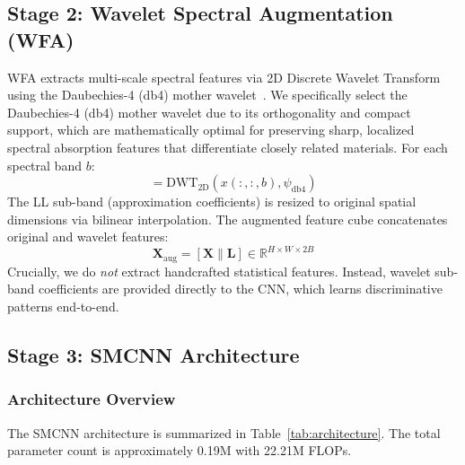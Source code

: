 \documentclass[conference]{IEEEtran}
\begin{document}
{\subsection{Stage 2: Wavelet Spectral Augmentation (WFA)}

WFA extracts multi-scale spectral features via 2D Discrete Wavelet Transform using the Daubechies-4 (db4) mother wavelet~\cite{daubechies1992ten}. We specifically select the Daubechies-4 (db4) mother wavelet due to its orthogonality and compact support, which are mathematically optimal for preserving sharp, localized spectral absorption features that differentiate closely related materials. For each spectral band $b$:
\begin{equation}
[\text{LL}_b, (\text{LH}_b, \text{HL}_b, \text{HH}_b)] = \text{DWT}_{2\text{D}}(x(:,:,b), \psi_{\text{db4}})
\end{equation}
The LL sub-band (approximation coefficients) is resized to original spatial dimensions via bilinear interpolation. The augmented feature cube concatenates original and wavelet features:
\begin{equation}
\mathbf{X}_{\text{aug}} = [\mathbf{X} \| \mathbf{L}] \in \mathbb{R}^{H \times W \times 2B}
\end{equation}
Crucially, we do \textit{not} extract handcrafted statistical features. Instead, wavelet sub-band coefficients are provided directly to the CNN, which learns discriminative patterns end-to-end.

\subsection{Stage 3: SMCNN Architecture}

\subsubsection{Architecture Overview}

The SMCNN architecture is summarized in Table~\ref{tab:architecture}. The total parameter count is approximately 0.19M with 22.21M FLOPs.

}
\end{document}
